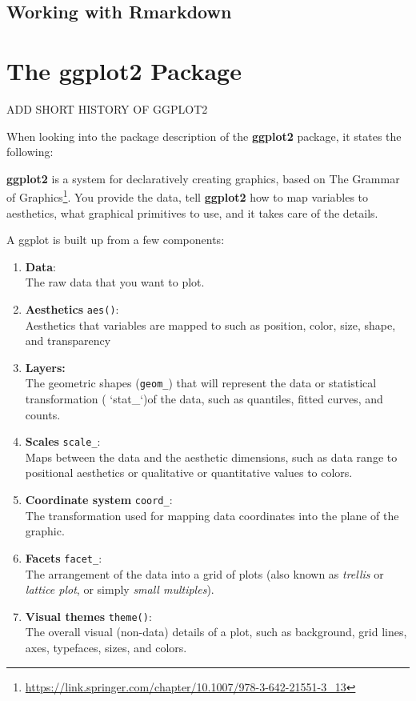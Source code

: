\documentclass[
]{krantz}
\providecommand{\tightlist}{%
  \setlength{\itemsep}{0pt}\setlength{\parskip}{0pt}}
\renewenvironment{quote}{\begin{VF}}{\end{VF}}
\renewcommand{\href}[2]{#2\footnote{\url{#1}}}
\begin{document}
\hypertarget{rmarkdown}{%
\section{Working with Rmarkdown}\label{rmarkdown}}

\hypertarget{ggplot}{%
\chapter{The ggplot2 Package}\label{ggplot}}

ADD SHORT HISTORY OF GGPLOT2

When looking into the package description of the \textbf{ggplot2} package, it states the following:

\begin{quote}
\textbf{ggplot2} is a system for declaratively creating graphics, based on \href{https://link.springer.com/chapter/10.1007/978-3-642-21551-3_13}{The Grammar of Graphics}. You provide the data, tell \textbf{ggplot2} how to map variables to aesthetics, what graphical primitives to use, and it takes care of the details.
\end{quote}

A ggplot is built up from a few components:

\begin{enumerate}
\def\labelenumi{\arabic{enumi}.}
\tightlist
\item
  \textbf{Data}:\\
  The raw data that you want to plot.
\item
  \textbf{Aesthetics} \texttt{aes()}:\\
  Aesthetics that variables are mapped to such as position, color, size, shape, and transparency
\item
  \textbf{Layers:}\\
  The geometric shapes (\texttt{geom\_}) that will represent the data or statistical transformation ( `stat\_`)of the data, such as quantiles, fitted curves, and counts.
\item
  \textbf{Scales} \texttt{scale\_}:\\
  Maps between the data and the aesthetic dimensions, such as data range to positional aesthetics or qualitative or quantitative values to colors.
\item
  \textbf{Coordinate system} \texttt{coord\_}:\\
  The transformation used for mapping data coordinates into the plane of the graphic.
\item
  \textbf{Facets} \texttt{facet\_}:\\
  The arrangement of the data into a grid of plots (also known as \emph{trellis} or \emph{lattice plot}, or simply \emph{small multiples}).
\item
  \textbf{Visual themes} \texttt{theme()}:\\
  The overall visual (non-data) details of a plot, such as background, grid lines, axes, typefaces, sizes, and colors.
\end{enumerate}
\end{document}
